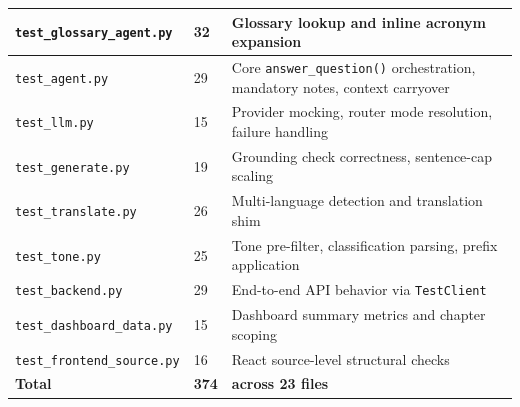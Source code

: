 \begin{longtable}{|p{}|p{}|p{}|}
\hline
\texttt{test\_\allowbreak{}glossary\_\allowbreak{}agent.py} & 32 & Glossary lookup and inline acronym expansion \\
\hline
\texttt{test\_\allowbreak{}agent.py} & 29 & Core \texttt{answer\_\allowbreak{}question()} orchestration, mandatory notes, context carryover \\
\hline
\texttt{test\_\allowbreak{}llm.py} & 15 & Provider mocking, router mode resolution, failure handling \\
\hline
\texttt{test\_\allowbreak{}generate.py} & 19 & Grounding check correctness, sentence-cap scaling \\
\hline
\texttt{test\_\allowbreak{}translate.py} & 26 & Multi-language detection and translation shim \\
\hline
\texttt{test\_\allowbreak{}tone.py} & 25 & Tone pre-filter, classification parsing, prefix application \\
\hline
\texttt{test\_\allowbreak{}backend.py} & 29 & End-to-end API behavior via \texttt{TestClient} \\
\hline
\texttt{test\_\allowbreak{}dashboard\_\allowbreak{}data.py} & 15 & Dashboard summary metrics and chapter scoping \\
\hline
\texttt{test\_\allowbreak{}frontend\_\allowbreak{}source.py} & 16 & React source-level structural checks \\
\hline
\textbf{Total} & \textbf{374} & \textbf{across 23 files} \\
\hline
\end{longtable}
